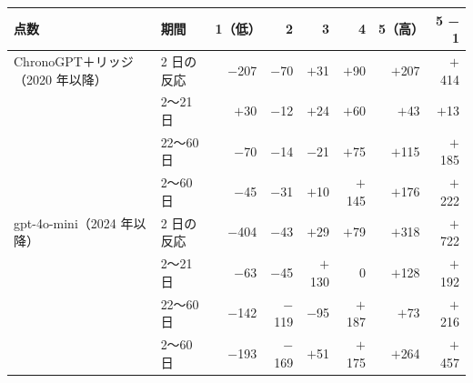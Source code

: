 \begin{tabular}{@{}llrrrrrr@{}}
\toprule
点数 & 期間 & 1（低） & 2 & 3 & 4 & 5（高） & 5 − 1 \\
\midrule
ChronoGPT＋リッジ（2020 年以降） & 2 日の反応 & $-$207 & $-$70 & $+$31 & $+$90 & $+$207 & $+$414 \\
 & 2〜21 日 & $+$30 & $-$12 & $+$24 & $+$60 & $+$43 & $+$13 \\
 & 22〜60 日 & $-$70 & $-$14 & $-$21 & $+$75 & $+$115 & $+$185 \\
 & 2〜60 日 & $-$45 & $-$31 & $+$10 & $+$145 & $+$176 & $+$222 \\
\addlinespace
gpt-4o-mini（2024 年以降） & 2 日の反応 & $-$404 & $-$43 & $+$29 & $+$79 & $+$318 & $+$722 \\
 & 2〜21 日 & $-$63 & $-$45 & $+$130 & 0 & $+$128 & $+$192 \\
 & 22〜60 日 & $-$142 & $-$119 & $-$95 & $+$187 & $+$73 & $+$216 \\
 & 2〜60 日 & $-$193 & $-$169 & $+$51 & $+$175 & $+$264 & $+$457 \\
\bottomrule
\end{tabular}

